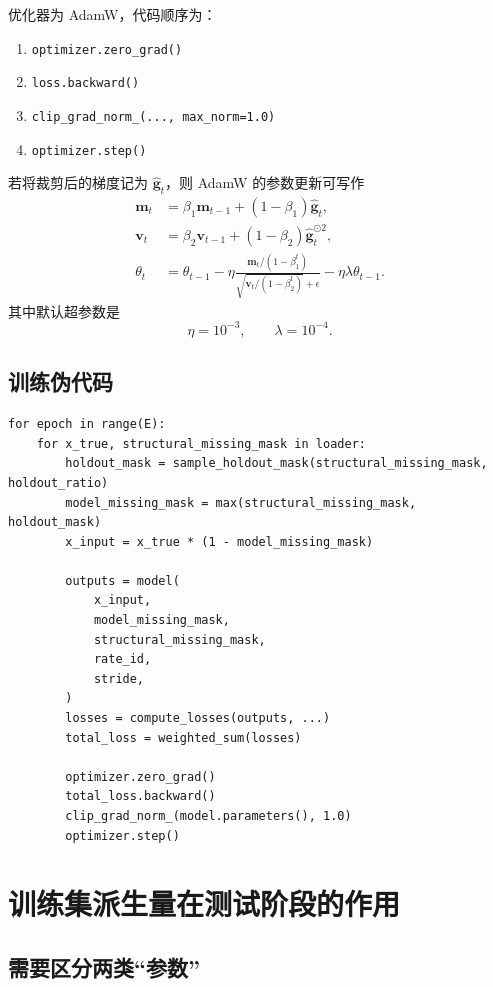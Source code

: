 \documentclass[UTF8,11pt,a4paper]{ctexart}
\begin{document}
优化器为 AdamW，代码顺序为：
\begin{enumerate}
  \item \texttt{optimizer.zero\_grad()}
  \item \texttt{loss.backward()}
  \item \texttt{clip\_grad\_norm\_(..., max\_norm=1.0)}
  \item \texttt{optimizer.step()}
\end{enumerate}

若将裁剪后的梯度记为 $\hat{\bm{g}}_t$，则 AdamW 的参数更新可写作
\begin{align}
\bm{m}_t &= \beta_1\bm{m}_{t-1} + (1-\beta_1)\hat{\bm{g}}_t,\\
\bm{v}_t &= \beta_2\bm{v}_{t-1} + (1-\beta_2)\hat{\bm{g}}_t^{\odot 2},\\
\theta_t &=
\theta_{t-1}
-\eta
\frac{\bm{m}_t/(1-\beta_1^t)}
{\sqrt{\bm{v}_t/(1-\beta_2^t)}+\epsilon}
-\eta\lambda \theta_{t-1}.
\end{align}
其中默认超参数是
\[
\eta=10^{-3},\qquad \lambda=10^{-4}.
\]

\subsection{训练伪代码}

\begin{lstlisting}
for epoch in range(E):
    for x_true, structural_missing_mask in loader:
        holdout_mask = sample_holdout_mask(structural_missing_mask, holdout_ratio)
        model_missing_mask = max(structural_missing_mask, holdout_mask)
        x_input = x_true * (1 - model_missing_mask)

        outputs = model(
            x_input,
            model_missing_mask,
            structural_missing_mask,
            rate_id,
            stride,
        )
        losses = compute_losses(outputs, ...)
        total_loss = weighted_sum(losses)

        optimizer.zero_grad()
        total_loss.backward()
        clip_grad_norm_(model.parameters(), 1.0)
        optimizer.step()
\end{lstlisting}

\section{训练集派生量在测试阶段的作用}

\subsection{需要区分两类“参数”}
\end{document}
